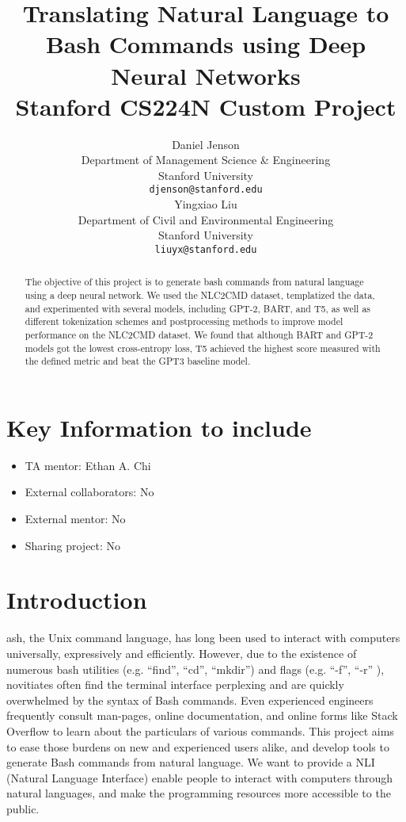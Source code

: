 \documentclass{article}
\title{
  Translating Natural Language to Bash Commands using Deep Neural Networks \\
  \vspace{1em}
  \small{\normalfont Stanford CS224N Custom Project}
}
\author{
 Daniel Jenson \\
  Department of Management Science \& Engineering \\
  Stanford University \\
  \texttt{djenson@stanford.edu} \\
  \And
  Yingxiao Liu \\
  Department of Civil and Environmental Engineering \\
  Stanford University \\
  \texttt{liuyx@stanford.edu} \\
}
\begin{document}
\maketitle

\begin{abstract}
	The objective of this project is to generate bash commands from natural
	language using a deep neural network. We used the NLC2CMD dataset, templatized
	the data, and experimented with several models, including GPT-2, BART, and T5,
	as well as different tokenization schemes and postprocessing methods to improve
	model performance on the NLC2CMD dataset. We found that although BART and GPT-2
	models got the lowest cross-entropy loss, T5 achieved the highest score
	measured with the defined metric and beat the GPT3 baseline model.
\end{abstract}


\section{Key Information to include}
\begin{itemize}
	\item TA mentor: Ethan A. Chi
	\item External collaborators: No
	\item External mentor: No
	\item Sharing project: No
\end{itemize}


\section{Introduction}
ash, the Unix command language, has long been used to interact with computers
universally, expressively and efficiently.  However, due to the existence of
numerous bash utilities (e.g. ``find'', ``cd'', ``mkdir'') and flags (e.g.
``-f'', ``-r'' ), novitiates often find the terminal interface perplexing and
are quickly overwhelmed by the syntax of Bash commands. Even experienced
engineers frequently consult man-pages, online documentation, and online forms
like Stack Overflow to learn about the particulars of various commands. This
project aims to ease those burdens on new and experienced users alike, and
develop tools to generate Bash commands from natural language. We want to
provide a NLI (Natural Language Interface) enable people to interact with
computers through natural languages, and make the programming resources more
accessible to the public.
\end{document}
